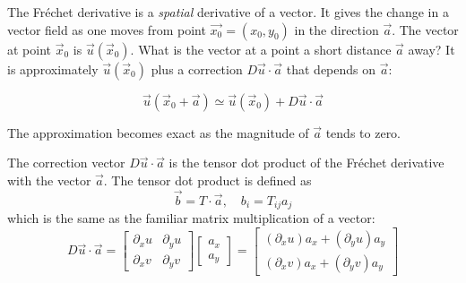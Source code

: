 \documentclass[a4paper]{report}
\begin{document}
The Fr\'{e}chet derivative is a \emph{spatial} derivative of a vector.  It gives the change in a vector field as one moves from point $\vec{x_0} = (x_0,y_0)$ in the direction $\vec{a}$.
The vector at point $\vec{x}_0$ is $\vec{u}(\vec{x}_0)$.  What is the vector at a point a short distance $\vec{a}$ away?  It is approximately $\vec{u}(\vec{x}_0)$ plus a correction $ D \vec{u} \cdot \vec{a}$ that depends on $\vec{a}$:

\begin{equation}
\vec{u}(\vec{x}_0 + \vec{a}) \simeq \vec{u}(\vec{x}_0) + D \vec{u} \cdot \vec{a}
\end{equation}

The approximation becomes exact as the magnitude of $\vec{a}$ tends to zero.

\begin{center}
\end{center}

The correction vector $ D\vec{u} \cdot \vec{a}$ is the tensor dot product of the Fr\'{e}chet derivative with the vector $\vec{a}$. The tensor dot product is defined as
\begin{equation}
\vec{b} = T \cdot \vec{a} ,\quad b_i = T_{ij} a_j
\end{equation}
which is the same as the familiar matrix multiplication of a vector:
\begin{equation}
D \vec{u} \cdot \vec{a} =
\begin{bmatrix}
\partial_x u & \partial_y u \\
\partial_x v & \partial_y v
\end{bmatrix}
\begin{bmatrix}
a_x \\ a_y
\end{bmatrix}
=
\begin{bmatrix}
(\partial_x u) a_x + (\partial_y u) a_y \\
(\partial_x v) a_x + (\partial_y v) a_y
\end{bmatrix}
\end{equation}
\end{document}
